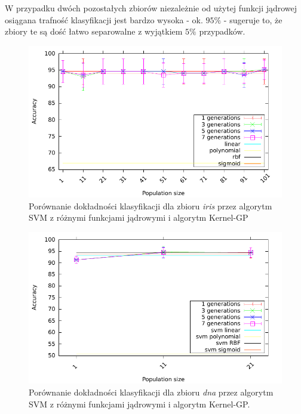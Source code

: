 	W przypadku dwóch pozostałych zbiorów niezależnie od użytej funkcji jądrowej osiągana trafność klasyfikacji jest bardzo wysoka - ok. $ 95\% $ - sugeruje to, że zbiory te są dość łatwo separowalne z wyjątkiem $ 5\% $ przypadków.
	
	\begin{figure}
		\includegraphics[scale=0.90]{figures/accuracy/accuracy-iris-svm}
		\caption{Porównanie dokładności klasyfikacji dla zbioru \emph{iris} przez algorytm SVM z różnymi funkcjami jądrowymi i algorytm Kernel-GP\label{fig:acc-iris-svm}}
	\end{figure}
	
	\begin{figure}
		\includegraphics[scale=0.90]{figures/accuracy/accuracy-dna-svm}
		\caption{Porównanie dokładności klasyfikacji dla zbioru \emph{dna} przez algorytm SVM z różnymi funkcjami jądrowymi i algorytm Kernel-GP.\label{fig:acc-dna-svm}}
	\end{figure}	
	
